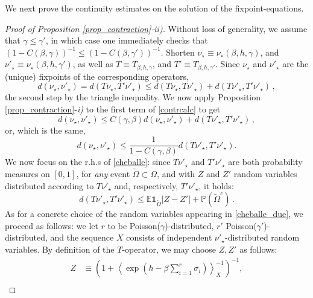 \documentclass[a4paper,12pt,oneside,reqno]{amsart}
\numberwithin{equation}{section}
\begin{document}
We next prove the continuity estimates on the solution of the fixpoint-equations. 

\begin{proof}[Proof of Proposition \ref{prop_contraction}-ii)]  Without loss of generality, we assume that 
$\gamma \leq \gamma'$, in which case one immediately checks that $(1-C({\beta}, \gamma))^{-1} \leq (1-C({\beta}, \gamma'))^{-1}$. Shorten $\nu_\star {\equiv} \nu_\star\left({\beta},h,\gamma \right)$, and $\nu'_\star {\equiv} \nu_\star\left({\beta},h,\gamma' \right)$, as well as $T{\equiv} T_{{\beta},h,\gamma}$, and $T' {\equiv} T_{{\beta},h,\gamma'}$.  Since $\nu_\star$ and $\nu'_\star$ are the (unique) fixpoints of the corresponding operators, 
\begin{equation}\label{contrcalc} 
d\left(\nu_\star,\nu'_\star\right)= d\left(T\nu_\star,T'\nu'_\star\right)\leq d\left(T\nu_\star,T\nu'_\star\right)+d\left(T\nu'_\star,T'\nu'_\star\right)\,,
\end{equation}
the second step by the triangle inequality. We now apply Proposition \ref{prop_contraction}-{\it i)} to the first term of 
 \eqref{contrcalc}  to get 
\[
d\left(\nu_\star,\nu'_\star\right) \leq C(\gamma,\beta) d\left(\nu_\star,\nu'_\star\right)+d\left(T\nu'_\star,T'\nu'_\star\right)\,,
\]
or, which is the same, 
\begin{equation} \label{cheballe}
d\left(\nu_\star,\nu'_\star\right) \leq \frac{1}{1-C(\gamma,\beta)}d\left(T\nu'_\star,T'\nu'_\star\right).
\end{equation}
We now focus on the r.h.s of \eqref{cheballe}: since $T\nu'_\star$ and $T'\nu'_\star$ are both probability measures on $[0,1]$, for {\it any} event $\tilde \Omega \subset \Omega$, and with  $Z$ and $Z'$ random variables distributed according to $T\nu'_\star$ and, respectively, $T'\nu'_\star$, it holds: 
\begin{equation} \label{cheballe_due}
d\left(T\nu'_\star,T'\nu'_\star\right) \leq {{\mathbb{E}}} \textbf{1}_{\tilde \Omega}\left|Z-Z'\right|+ {\mathbb{P}}\left(\tilde \Omega^c\right)\,.
\end{equation}
As for a concrete choice of the random variables appearing in \eqref{cheballe_due}, we proceed as follows: 
we let $r$ to be Poisson($\gamma$)-distributed, $r'$ Poisson($\gamma'$)-distributed, and the sequence $X$ consists of independent $\nu'_\star$-distributed random variables. By definition of the $T$-operator, we may choose $Z,Z'$ as follows:
\[ \begin{aligned}
Z &{\equiv} \left(1+ \left< \exp\left(h-\beta\sum_{i=1}^r \sigma_i\right) \right>^{-1}_X \right)^{-1}, \\

\end{aligned}\]
\end{proof}
\end{document}
